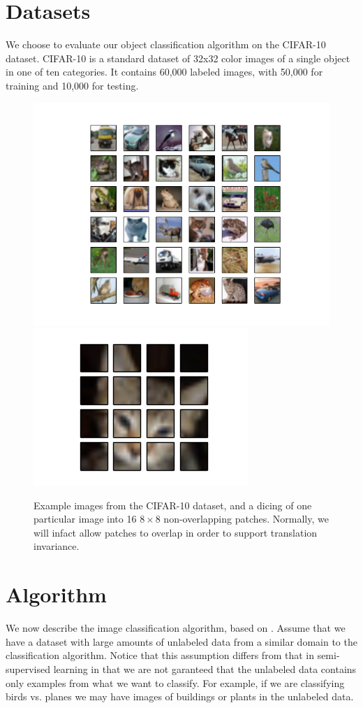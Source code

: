 \documentclass{article} %
\begin{document}
\section{Datasets}
We choose to evaluate our object classification algorithm on the CIFAR-10 dataset. CIFAR-10 is a standard dataset of 32x32 color images of a single object in one of ten categories. It contains 60,000 labeled images, with 50,000 for training and 10,000 for testing.

\begin{figure}
\includegraphics[width=0.5\columnwidth]{./images/examples.png}
\includegraphics[width=0.5\columnwidth]{./images/extracted_patches.png}
\caption{Example images from the CIFAR-10 dataset, and a dicing of one particular image into 16 $8 \times 8$ non-overlapping patches. Normally, we will infact allow patches to overlap in order to support translation invariance.}
\end{figure}

\section{Algorithm}
We now describe the image classification algorithm, based on \cite{coates11}. Assume that we have a dataset with large amounts of unlabeled data from a similar domain to the classification algorithm. Notice that this assumption differs from that in semi-supervised learning in that we are not garanteed that the unlabeled data contains only examples from what we want to classify. For example, if we are classifying birds vs. planes we may have images of buildings or plants in the unlabeled data.
\end{document}

